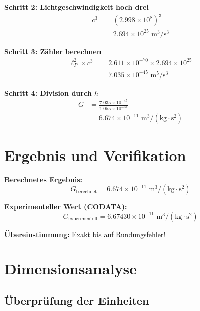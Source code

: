 \documentclass[12pt,a4paper]{article}
\theoremstyle{definition}
\begin{document}
	\textbf{Schritt 2: Lichtgeschwindigkeit hoch drei}
	\begin{align}
		c^3 &= (2.998 \times 10^{8})^3 \\
		&= 2.694 \times 10^{25} \text{ m}^3/\text{s}^3
	\end{align}
	
	\textbf{Schritt 3: Zähler berechnen}
	\begin{align}
		\ell_P^2 \times c^3 &= 2.611 \times 10^{-70} \times 2.694 \times 10^{25} \\
		&= 7.035 \times 10^{-45} \text{ m}^5/\text{s}^3
	\end{align}
	
	\textbf{Schritt 4: Division durch $\hbar$}
	\begin{align}
		G &= \frac{7.035 \times 10^{-45}}{1.055 \times 10^{-34}} \\
		&= 6.674 \times 10^{-11} \text{ m}^3/(\text{kg} \cdot \text{s}^2)
	\end{align}
	
	\section{Ergebnis und Verifikation}
	
	\begin{result}
		\textbf{Berechnetes Ergebnis:}
		\begin{equation}
			G_{\text{berechnet}} = 6.674 \times 10^{-11} \text{ m}^3/(\text{kg} \cdot \text{s}^2)
		\end{equation}
		
		\textbf{Experimenteller Wert (CODATA):}
		\begin{equation}
			G_{\text{experimentell}} = 6.67430 \times 10^{-11} \text{ m}^3/(\text{kg} \cdot \text{s}^2)
		\end{equation}
		
		\textbf{Übereinstimmung:} Exakt bis auf Rundungsfehler!
	\end{result}
	
	\section{Dimensionsanalyse}
	
	\subsection{Überprüfung der Einheiten}
	
\end{document}
